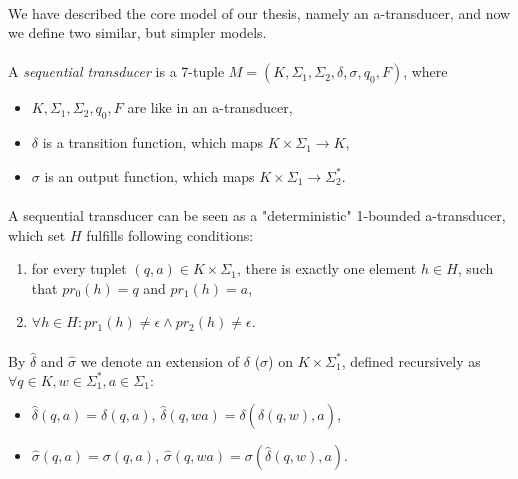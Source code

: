 \paragraph{}
We have described the core model of our thesis, namely an a-transducer, and now we define two similar, but simpler models.

\paragraph{}
 A \emph{sequential transducer} is a 7-tuple $M=(K, \Sigma_{1}, \Sigma_{2}, \delta, \sigma, q_{0}, F)$, where
\begin{itemize} 
\item $K, \Sigma_{1}, \Sigma_{2}, q_{0}, F$ are like in an a-transducer,
\item $\delta $ is a transition function, which maps $K \times \Sigma_{1} \rightarrow K$,
\item $\sigma $ is an output function, which maps $K \times \Sigma_{1} \rightarrow \Sigma_{2}^{*} $.
\end{itemize}

\paragraph{} 
A sequential transducer can be seen as a "deterministic" 1-bounded a-transducer, which set $H$ fulfills following conditions:
\begin{enumerate}
\item for every tuplet $(q, a) \in K \times \Sigma_{1}$, there is exactly one element $h \in H$, such that $pr_{0}(h) = q$ and $pr_{1}(h) = a$,
\item $\forall h \in H: pr_{1}(h) \neq \epsilon \wedge pr_{2}(h) \neq \epsilon $.
\end{enumerate}

\paragraph{}
\oznacenie By $\hat{\delta}$ and $\hat{\sigma}$ we denote an extension of $\delta $ ($\sigma $) on $K \times \Sigma_{1}^{*} $, defined recursively as \\
$\forall q \in K, w \in \Sigma_{1}^{*}, a \in \Sigma_{1}:$ \\
\begin{itemize} 
\item $\hat{\delta}(q, a) = \delta (q,a)$, $\hat{\delta}(q,wa) = \delta (\hat{\delta}(q, w), a)$,
\item $\hat{\sigma}(q, a) = \sigma (q,a)$, $\hat{\sigma}(q,wa) = \sigma (\hat{\delta}(q, w), a)$.
\end{itemize}

